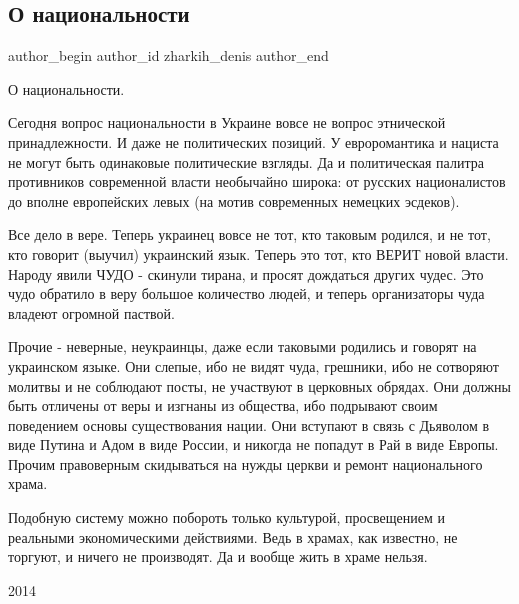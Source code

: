  
 
 
 
 
 
\subsection{О национальности}
\label{sec:05_10_2021.fb.zharkih_denis.1.nacionalnost_2014}
 
\ifcmt
 author_begin
   author_id zharkih_denis
 author_end
\fi

О национальности.

Сегодня вопрос национальности в Украине вовсе не вопрос этнической
принадлежности. И даже не политических позиций. У евроромантика и нациста не
могут быть одинаковые политические взгляды. Да и политическая палитра
противников современной власти необычайно широка: от русских националистов до
вполне европейских левых (на мотив современных немецких эсдеков).

Все дело в вере. Теперь украинец вовсе не тот, кто таковым родился, и не тот,
кто говорит (выучил) украинский язык. Теперь это тот, кто ВЕРИТ новой власти.
Народу явили ЧУДО - скинули тирана, и просят дождаться других чудес. Это чудо
обратило в веру большое количество людей, и теперь организаторы чуда владеют
огромной паствой.

Прочие - неверные, неукраинцы, даже если таковыми родились и говорят на
украинском языке. Они слепые, ибо не видят чуда, грешники, ибо не сотворяют
молитвы и не соблюдают посты, не участвуют в церковных обрядах. Они должны быть
отличены от веры и изгнаны из общества, ибо подрывают своим поведением основы
существования нации. Они вступают в связь с Дьяволом в виде Путина и Адом в
виде России, и никогда не попадут в Рай в виде Европы. Прочим правоверным
скидываться на нужды церкви и ремонт национального храма.

Подобную систему можно побороть только культурой, просвещением и реальными
экономическими действиями. Ведь в храмах, как известно, не торгуют, и ничего не
производят. Да и вообще жить в храме нельзя.

2014
